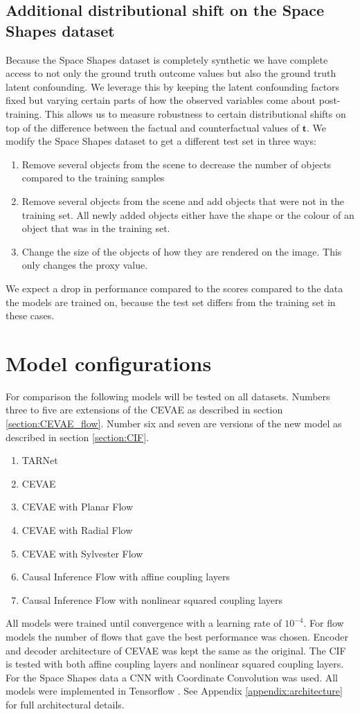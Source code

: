 \documentclass{report}
\newcommand{\bt}{\mathbf{t}}
\begin{document}
\subsection{Additional distributional shift on the Space Shapes dataset}
Because the Space Shapes dataset is completely synthetic we have complete access to not only the ground truth outcome values but also the ground truth latent confounding. We leverage this by keeping the latent confounding factors fixed but varying certain parts of how the observed variables come about post-training. This allows us to measure robustness to certain distributional shifts on top of the difference between the factual and counterfactual values of $\bt$. We modify the Space Shapes dataset to get a different test set in three ways:
\begin{enumerate}
    \item Remove several objects from the scene to decrease the number of objects compared to the training samples
    \item Remove several objects from the scene and add objects that were not in the training set. All newly added objects either have the shape or the colour of an object that was in the training set.
    \item Change the size of the objects of how they are rendered on the image. This only changes the proxy value.
\end{enumerate}
We expect a drop in performance compared to the scores compared to the data the models are trained on, because the test set differs from the training set in these cases.

\section{Model configurations}
For comparison the following models will be tested on all datasets. Numbers three to five are extensions of the CEVAE as described in section \ref{section:CEVAE_flow}. Number six and seven are versions of the new model as described in section \ref{section:CIF}.
\begin{enumerate}
    \item TARNet
    \item CEVAE
    \item CEVAE with Planar Flow
    \item CEVAE with Radial Flow
    \item CEVAE with Sylvester Flow
    \item Causal Inference Flow with affine coupling layers
    \item Causal Inference Flow with nonlinear squared coupling layers
\end{enumerate}
All models were trained until convergence with a learning rate of $10^{-4}$. For flow models the number of flows that gave the best performance was chosen. Encoder and decoder architecture of CEVAE was kept the same as the original. The CIF is tested with both affine coupling layers and nonlinear squared coupling layers. For the Space Shapes data a CNN with Coordinate Convolution \parencite{liu2018intriguing} was used. All models were implemented in Tensorflow \parencite{tensorflow2015-whitepaper}. See Appendix \ref{appendix:architecture} for full architectural details.
\end{document}
